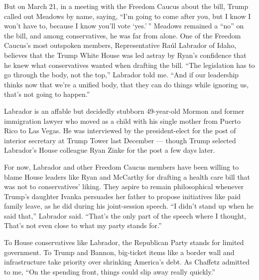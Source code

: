 But on March 21, in a meeting with the Freedom Caucus about the bill,
Trump called out Meadows by name, saying, ``I'm going to come after you,
but I know I won't have to, because I know you'll vote `yes.' '' Meadows
remained a ``no'' on the bill, and among conservatives, he was far from
alone. One of the Freedom Caucus's most outspoken members,
Representative Raúl Labrador of Idaho, believes that the Trump White
House was led astray by Ryan's confidence that he knew what
conservatives wanted when drafting the bill. ``The legislation has to go
through the body, not the top,'' Labrador told me. ``And if our
leadership thinks now that we're a unified body, that they can do things
while ignoring us, that's not going to happen.''

Labrador is an affable but decidedly stubborn 49-year-old Mormon and
former immigration lawyer who moved as a child with his single mother
from Puerto Rico to Las Vegas. He was interviewed by the president-elect
for the post of interior secretary at Trump Tower last December ---
though Trump selected Labrador's House colleague Ryan Zinke for the post
a few days later.

For now, Labrador and other Freedom Caucus members have been willing to
blame House leaders like Ryan and McCarthy for drafting a health care
bill that was not to conservatives' liking. They aspire to remain
philosophical whenever Trump's daughter Ivanka persuades her father to
propose initiatives like paid family leave, as he did during his
joint-session speech. ``I didn't stand up when he said that,'' Labrador
said. ``That's the only part of the speech where I thought, That's not
even close to what my party stands for.''

To House conservatives like Labrador, the Republican Party stands for
limited government. To Trump and Bannon, big-ticket items like a border
wall and infrastructure take priority over shrinking America's debt. As
Chaffetz admitted to me, ``On the spending front, things could slip away
really quickly.''

